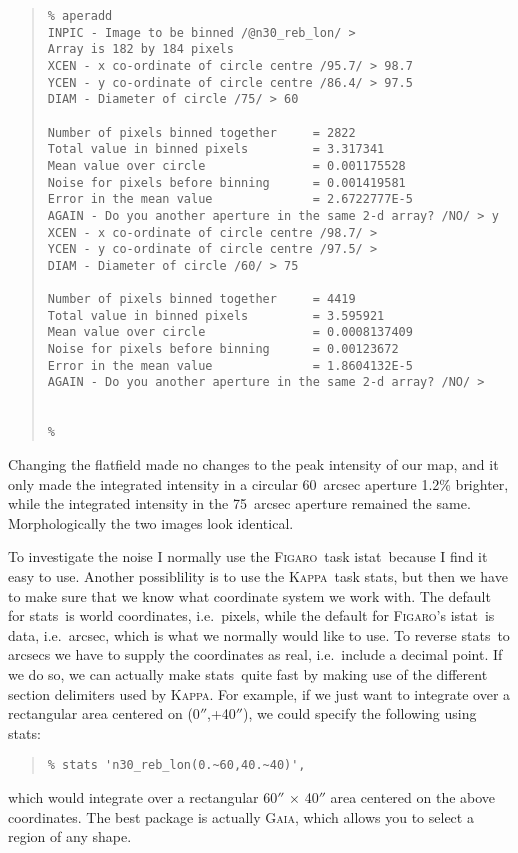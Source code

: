 \documentclass[twoside,11pt]{article}
\newenvironment{myquote}{\begin{quote}\begin{small}}{\end{small}\end{quote}}
\newcommand{\Kappa}{\xref{\textsc{Kappa}}{sun95}{}}
\newcommand{\Figaro}{\xref{\textsc{Figaro}}{sun86}{}}
\newcommand{\gaia}{\xref{\textsc{Gaia}}{sun214}{}}
\newcommand{\task}[1]{\textsf{#1}}
\newcommand{\stats}{\xref{\task{stats}}{sun95}{STATS}}
\newcommand{\istat}{\xref{\task{istat}}{sun86}{ISTAT}}
\newcommand{\xref}[3]{#1}
\begin{document}
\begin{myquote} \begin{verbatim}
% aperadd
INPIC - Image to be binned /@n30_reb_lon/ > 
Array is 182 by 184 pixels
XCEN - x co-ordinate of circle centre /95.7/ > 98.7
YCEN - y co-ordinate of circle centre /86.4/ > 97.5
DIAM - Diameter of circle /75/ > 60
 
Number of pixels binned together     = 2822
Total value in binned pixels         = 3.317341
Mean value over circle               = 0.001175528
Noise for pixels before binning      = 0.001419581
Error in the mean value              = 2.6722777E-5
AGAIN - Do you another aperture in the same 2-d array? /NO/ > y
XCEN - x co-ordinate of circle centre /98.7/ > 
YCEN - y co-ordinate of circle centre /97.5/ > 
DIAM - Diameter of circle /60/ > 75
 
Number of pixels binned together     = 4419
Total value in binned pixels         = 3.595921
Mean value over circle               = 0.0008137409
Noise for pixels before binning      = 0.00123672
Error in the mean value              = 1.8604132E-5
AGAIN - Do you another aperture in the same 2-d array? /NO/ > 


% 
\end{verbatim} \end{myquote}



Changing the flatfield made no changes to the peak intensity of our map,
and it only made the integrated intensity in a circular 60~arcsec aperture 1.2\%
brighter, while the integrated intensity in the 75~arcsec aperture remained
the same.  Morphologically the two images look identical.


To investigate the noise I normally use the \Figaro\ task \istat\
because I find it easy to use. Another possiblility is to use the
\Kappa\ task \stats, but then we have to make sure that we know what
coordinate system we work with.  The default for \stats\ is world
coordinates, i.e.\ pixels, while the default for \Figaro's 
\istat\ is data, i.e.\ arcsec, which is what we normally would
like to use. To reverse \stats\ to arcsecs we have to supply
the coordinates as real, i.e.\ include a decimal point. If we do so,
we can actually make \stats\ quite fast by making use of the
different section delimiters used by \Kappa. For example, if we just
want to integrate over a rectangular area centered on (0$''$,+40$''$), we
could specify the following using \stats: 
\begin{myquote} 
\begin{verbatim} 
% stats 'n30_reb_lon(0.~60,40.~40)', 
\end{verbatim} \end{myquote} 
which would integrate over a
rectangular 60$''$ $\times$ 40$''$ area centered on the above coordinates. The
best package is actually \gaia, which allows you to select a region of
any shape.
\end{document}
